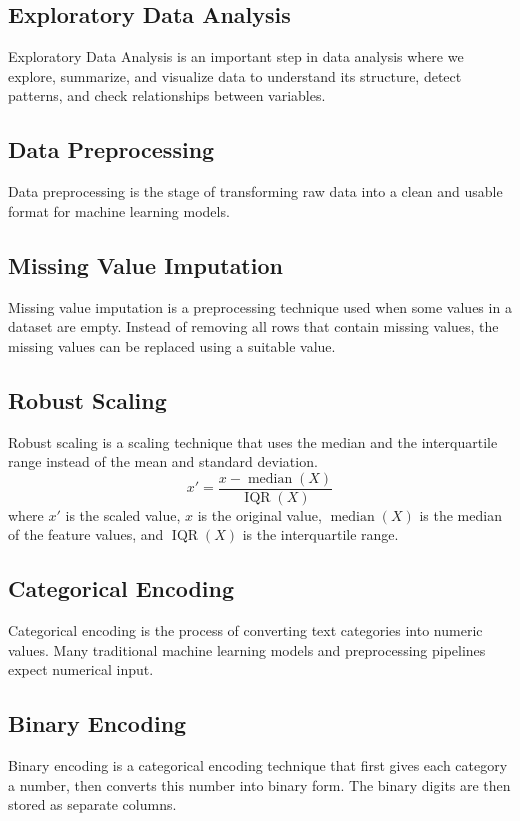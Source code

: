 \documentclass[12pt,a4paper]{report}
\begin{document}
\subsection{Exploratory Data Analysis}
Exploratory Data Analysis is an important step in data analysis where we explore,
summarize, and visualize data to understand its structure, detect patterns, 
and check relationships between variables.

\subsection{Data Preprocessing}
Data preprocessing is the stage of transforming raw data into a clean and usable
format for machine learning models.

\subsection{Missing Value Imputation}
Missing value imputation is a preprocessing technique used when some values in a
dataset are empty. Instead of removing all rows that contain missing
values, the missing values can be replaced using a suitable value.

\subsection{Robust Scaling}
Robust scaling is a scaling technique that uses the median and the
interquartile range instead of the mean and standard deviation. 
\[
x' = \frac{x - \mathop{\mathrm{median}}(X)}{\mathop{\mathrm{IQR}}(X)}
\]
where $x'$ is the scaled value, $x$ is the original value,
$\mathop{\mathrm{median}}(X)$ is the median of the feature values, and
$\mathop{\mathrm{IQR}}(X)$ is the interquartile range.

\subsection{Categorical Encoding}
Categorical encoding is the process of converting text categories into numeric
values. Many traditional machine learning models and preprocessing pipelines
expect numerical input.

\subsection{Binary Encoding}
Binary encoding is a categorical encoding technique that first gives each
category a number, then converts this number into binary form. The binary digits
are then stored as separate columns. 
\end{document}
